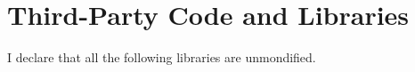 \chapter{Third-Party Code and Libraries}






I declare that all the following libraries are unmondified.

